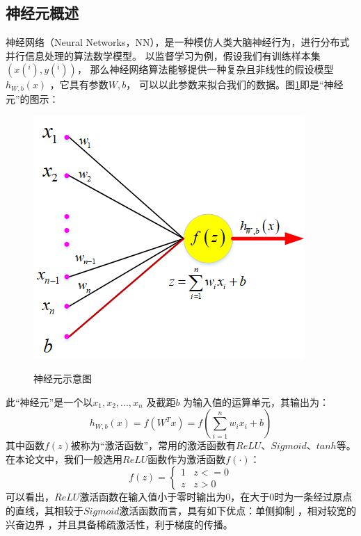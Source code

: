 \subsection{神经元概述}
神经网络（Neural Networks，NN），是一种模仿人类大脑神经行为，进行分布式并行信息处理的算法数学模型。
以监督学习为例，假设我们有训练样本集$(x(^i),y(^i))$，
那么神经网络算法能够提供一种复杂且非线性的假设模型$h_{W,b}(x)$ ，它具有参数$W, b$，
可以以此参数来拟合我们的数据。图\ref{fig_2_1}即是“神经元”的图示：\par
\begin{figure}[htbp]
	\centering
	\includegraphics[scale=0.9]{figures/chapter_2/fig_2_1.png}\\
	\caption{神经元示意图}\label{fig_2_1}
\end{figure}
此“神经元”是一个以$x_1, x_2, ..., x_n$ 及截距$b$ 为输入值的运算单元，其输出为：
\begin{equation}
	h_{W,b}(x) = f(W^Tx) = f(\sum_{i=1}^n w_{i}x_i +b)
\end{equation} 
其中函数$f(z)$被称为“激活函数”，常用的激活函数有$ReLU、Sigmoid、tanh$等。在本论文中，我们一般选用$ReLU$函数作为激活函数$f(\cdot)$：
\begin{equation}
	f(z) = 
	\begin{cases}
		1 & z <=0\\
		z & z > 0
	\end{cases}
\end{equation}
可以看出，$ReLU$激活函数在输入值小于零时输出为0，在大于0时为一条经过原点的直线，其相较于$Sigmoid$激活函数而言，具有如下优点：单侧抑制 ，相对较宽的兴奋边界 ，并且具备稀疏激活性，利于梯度的传播。\par

